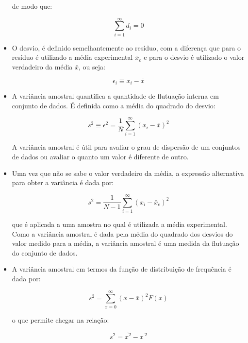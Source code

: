 \documentclass[11pt,a4paper]{article}
\begin{document}
\begin{itemize}
				de modo que:

					\begin{equation}
						\sum_{i = 1}^{\infty} d_i = 0
					\end{equation}

			\item O desvio, é definido semelhantemente ao resíduo, com a diferença que para o resíduo é utilizado a média experimental $\bar{x}_e$ e para o desvio é utilizado o valor verdadeiro da média $\bar{x}$, ou seja:
				
					\begin{equation}
						\epsilon_i \equiv x_i - \bar{x}
					\end{equation}


			\item A variância amostral quantifica a quantidade de flutuação interna em conjunto de dados. É definida como a média do quadrado do desvio:
				
					\begin{equation}
						s^2 \equiv \epsilon^2 = \frac{1}{N} \sum_{i = 1}^{\infty} (x_i - \bar{x})^2
					\end{equation}

				A variância amostral é útil para avaliar o grau de dispersão de um conjuntos de dados ou avaliar o quanto um valor é diferente de outro. 

			\item Uma vez que não se sabe o valor verdadeiro da média, a expressão alternativa para obter a variância é dada por:
				
					\begin{equation}
						s^2 = \frac{1}{N - 1} \sum_{i = 1}^{\infty} (x_i - \bar{x}_e)^2
					\end{equation}

				que é aplicada a uma amostra no qual é utilizada a média experimental. Como a variância amostral é dada pela média do quadrado dos desvios do valor medido para a média, a variância amostral é uma medida da flutuação do conjunto de dados. 
				
			\item A variância amostral em termos da função de distribuição de frequência é dada por:
				
					\begin{equation}
						s^2 = \sum_{x = 0}^{\infty} (x - \bar{x})^2 F(x)
					\end{equation}

				o que permite chegar na relação:

					\begin{equation}
						s^2 = \overline{x^2} - \overline{x}{\,}^2
					\end{equation}
        \end{itemize}
\end{document}
